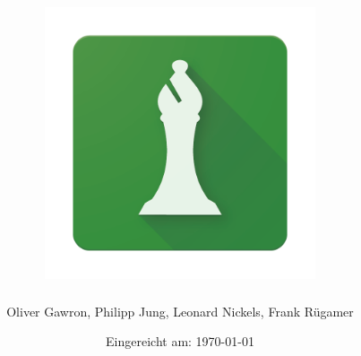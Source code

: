 \documentclass[12pt,oneside,numbers=noenddot,a4paper,parskip]{scrbook}
\def\BaAuthor{Oliver Gawron, Philipp Jung, Leonard Nickels, Frank Rügamer}
\def\BaTitle{\includegraphics[width= 0.6\textwidth]{resources/App_Logo}}
\def\BaSupervisorTwo{Prof.\ Dr.\ Steffen Heinzl}
\def\BaSupervisorOne{Vitaliy Schreibmann}
\begin{document}


\frontmatter
\titlehead{%
  {Hochschule für angewandte Wissenschaften Würzburg-Schweinfurt\\
   Fakultät Informatik und Wirtschaftsinformatik}}
\subject{Dokumentation Programmierprojekt:\linebreak \linebreak Spielesammlung}
\title{\BaTitle\\[15mm]}
\author{\BaAuthor}
\date{\normalsize{Eingereicht am: \today}}
\publishers{
  \normalsize{Betreuer: \BaSupervisorOne}\\
  \normalsize{Zweitpr\"{u}fer: \BaSupervisorTwo}\\
}


\maketitle



\tableofcontents



\mainmatter











\backmatter



\listoffigures
{}

\listoftables

\lstlistoflistings
{}


\printbibliography
{}
\end{document}
